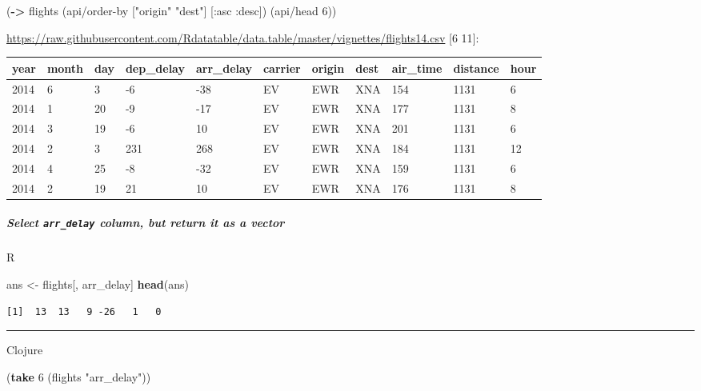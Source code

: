 \documentclass[]{article}
\newenvironment{Shaded}{\begin{snugshade}}{\end{snugshade}}
\newcommand{\AttributeTok}[1]{\textcolor[rgb]{0.77,0.63,0.00}{#1}}
\newcommand{\DecValTok}[1]{\textcolor[rgb]{0.00,0.00,0.81}{#1}}
\newcommand{\KeywordTok}[1]{\textcolor[rgb]{0.13,0.29,0.53}{\textbf{#1}}}
\newcommand{\NormalTok}[1]{#1}
\newcommand{\StringTok}[1]{\textcolor[rgb]{0.31,0.60,0.02}{#1}}
\let\oldsubparagraph\subparagraph
\renewcommand{\subparagraph}[1]{\oldsubparagraph{#1}\mbox{}}
\begin{document}
\begin{Shaded}
\begin{Highlighting}[]
\NormalTok{(}\KeywordTok{->}\NormalTok{ flights}
\NormalTok{    (api/order-by [}\StringTok{"origin"} \StringTok{"dest"}\NormalTok{] [}\AttributeTok{:asc} \AttributeTok{:desc}\NormalTok{])}
\NormalTok{    (api/head }\DecValTok{6}\NormalTok{))}
\end{Highlighting}
\end{Shaded}

\url{https://raw.githubusercontent.com/Rdatatable/data.table/master/vignettes/flights14.csv}
{[}6 11{]}:

\begin{longtable}[]{@{}lllllllllll@{}}
\toprule
year & month & day & dep\_delay & arr\_delay & carrier & origin & dest &
air\_time & distance & hour\tabularnewline
\midrule
\endhead
2014 & 6 & 3 & -6 & -38 & EV & EWR & XNA & 154 & 1131 & 6\tabularnewline
2014 & 1 & 20 & -9 & -17 & EV & EWR & XNA & 177 & 1131 &
8\tabularnewline
2014 & 3 & 19 & -6 & 10 & EV & EWR & XNA & 201 & 1131 & 6\tabularnewline
2014 & 2 & 3 & 231 & 268 & EV & EWR & XNA & 184 & 1131 &
12\tabularnewline
2014 & 4 & 25 & -8 & -32 & EV & EWR & XNA & 159 & 1131 &
6\tabularnewline
2014 & 2 & 19 & 21 & 10 & EV & EWR & XNA & 176 & 1131 & 8\tabularnewline
\bottomrule
\end{longtable}

\hypertarget{select-arr_delay-column-but-return-it-as-a-vector}{%
\subparagraph{\texorpdfstring{Select \texttt{arr\_delay} column, but
return it as a
vector}{Select arr\_delay column, but return it as a vector}}\label{select-arr_delay-column-but-return-it-as-a-vector}}

R

\begin{Shaded}
\begin{Highlighting}[]
\NormalTok{ans <-}\StringTok{ }\NormalTok{flights[, arr_delay]}
\KeywordTok{head}\NormalTok{(ans)}
\end{Highlighting}
\end{Shaded}

\begin{verbatim}
[1]  13  13   9 -26   1   0
\end{verbatim}

\begin{center}\rule{0.5\linewidth}{0.5pt}\end{center}

Clojure

\begin{Shaded}
\begin{Highlighting}[]
\NormalTok{(}\KeywordTok{take} \DecValTok{6}\NormalTok{ (flights }\StringTok{"arr_delay"}\NormalTok{))}
\end{Highlighting}
\end{Shaded}
\end{document}

